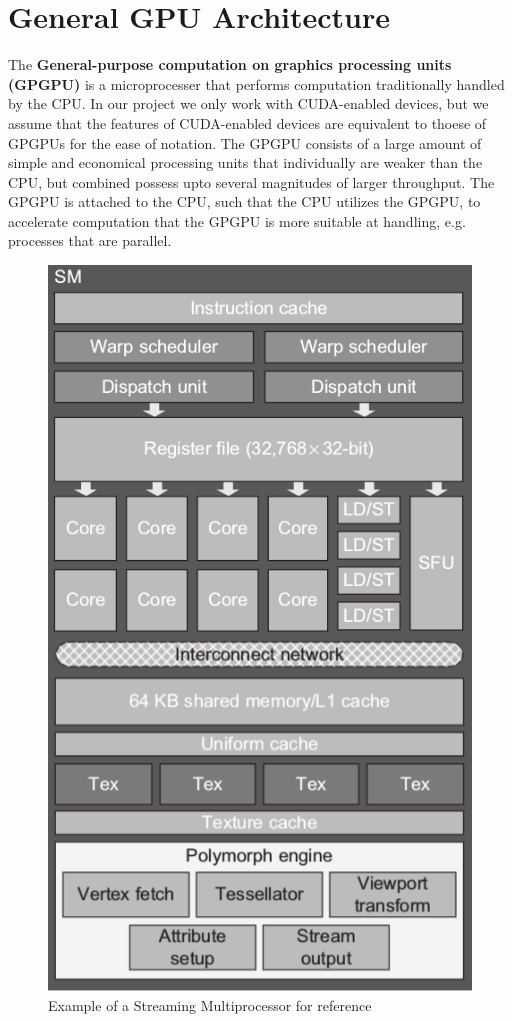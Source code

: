\section{General GPU Architecture}
\label{sec:gpu}

The \textbf{General-purpose computation on graphics processing units (GPGPU)} is a microprocesser that performs computation traditionally handled by the CPU.
In our project we only work with CUDA-enabled devices, but we assume that the features of CUDA-enabled devices are equivalent to thoese of GPGPUs for the ease of notation.
The GPGPU consists of a large amount of simple and economical processing units that individually are weaker than the CPU, but combined possess upto several magnitudes of larger throughput.
The GPGPU is attached to the CPU, such that the CPU utilizes the GPGPU, to accelerate computation that the GPGPU is more suitable at handling, e.g. processes that are parallel.

\begin{figure}[htb]
  \centering
  \includegraphics[width=.5\textwidth]{graphics/images/cropped-cuda-sm.png}
  \caption{Example of a Streaming Multiprocessor for reference~\cite{farber2011cuda}}
  \label{fig:sm example}
\end{figure}

